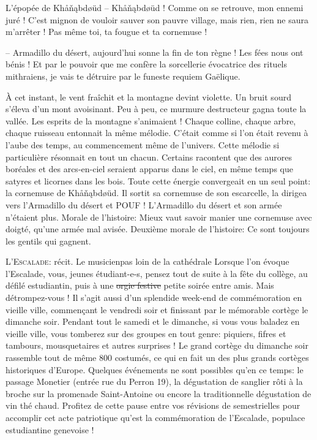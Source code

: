 \begin{spacing}{.94}
\begin{article}{L'épopée de Khåňąbdøüd}
-- Khåňąbdøüd ! Comme on se retrouve, mon ennemi juré ! C'est mignon de vouloir sauver son pauvre village, mais rien, rien ne saura m'arrêter ! Pas même toi, ta fougue et ta cornemuse !

-- Armadillo du désert, aujourd'hui sonne la fin de ton règne ! Les fées nous ont bénis ! Et par le pouvoir que me confère la sorcellerie évocatrice des rituels mithraiens, je vais te détruire par le funeste requiem Gaëlique.

À cet instant, le vent fraîchit et la montagne devint violette. Un bruit sourd s’éleva d’un mont avoisinant. Peu à peu, ce murmure destructeur gagna toute la vallée. Les esprits de la montagne s’animaient ! Chaque colline, chaque arbre, chaque ruisseau entonnait la même mélodie. C’était comme si l’on était revenu à l’aube des temps, au commencement même de l’univers. Cette mélodie si particulière résonnait en tout un chacun. Certains racontent que des aurores boréales et des arcs-en-ciel seraient apparus dans le ciel, en même temps que satyres et licornes dans les bois. Toute cette énergie convergeait en un seul point: la cornemuse de  Khåňąbdøüd. Il sortit sa cornemuse de son escarcelle, la dirigea vers l'Armadillo du désert et POUF ! L’Armadillo du désert et son armée n’étaient plus.
Morale de l’histoire: Mieux vaut savoir manier une cornemuse avec doigté, qu’une armée mal avisée.
Deuxième morale de l’histoire: Ce sont toujours les gentils qui gagnent.
\end{article}
\ligne
\begin{article}{\textsc{L'Escalade}: récit.}
{Le musicien}{pas loin de la cathédrale}
Lorsque l'on évoque l'Escalade, vous, jeunes étudiant-e-s, pensez tout de suite à la fête du collège, au défilé estudiantin, puis à une \st{orgie festive} petite soirée entre amis. Mais détrompez-vous ! Il s'agit aussi d'un splendide week-end de commémoration en vieille ville, commençant le vendredi soir et finissant par le mémorable cortège le dimanche soir. Pendant tout le samedi et le dimanche, si vous vous baladez en vieille ville, vous tomberez sur des groupes en tout genre: piquiers, fifres et tambours, mousquetaires et autres surprises ! Le grand cortège du dimanche soir rassemble tout de même 800 costumés, ce qui en fait un des plus grands cortèges historiques d'Europe. Quelques événements ne sont possibles qu'en ce temps: le passage Monetier (entrée rue du Perron 19), la dégustation de sanglier rôti à la broche sur la promenade Saint-Antoine ou encore la traditionnelle dégustation de vin thé chaud. Profitez de cette pause entre vos révisions de semestrielles pour accomplir cet acte patriotique qu'est la commémoration de l'Escalade, populace estudiantine genevoise !
\end{article}
\end{spacing}

